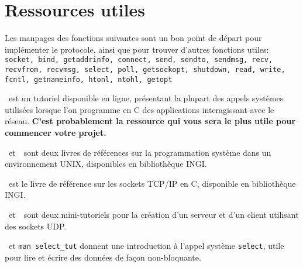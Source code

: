 \documentclass[a4paper,12pt]{article}
\begin{document}
\section{Ressources utiles}
Les manpages des fonctions suivantes sont un bon point de départ pour
implémenter le protocole, ainsi que pour trouver d'autres fonctions utiles:
\texttt{socket, bind, getaddrinfo, connect, send, sendto, sendmsg, recv,
    recvfrom, recvmsg, select, poll, getsockopt, shutdown, read, write, fcntl,
getnameinfo, htonl, ntohl, getopt}

\medskip

\cite{beej}~est un tutoriel disponible en ligne, présentant la plupart des appels
systèmes utilisées lorsque l'on programme en C des applications interagissant
avec le réseau.
\textbf{C'est probablement la ressource qui vous sera le plus utile pour commencer votre projet.}

\cite{stevens}~et~\cite{linux}~sont deux livres de références sur la
programmation système dans un environnement UNIX, disponibles en bibliothèque
INGI.\@

\cite{socket}~est le livre de référence sur les sockets TCP/IP en C,
disponible en bibliothèque INGI.\@

\cite{howtosend}~et~\cite{howtoreceive}~sont deux mini-tutoriels pour la création d'un serveur et
d'un client utilisant des sockets UDP.\@

\cite{select}~et \texttt{man select\_tut} donnent une introduction à l'appel système
\texttt{select}, utile pour lire et écrire des données de façon non-bloquante.



\end{document}
